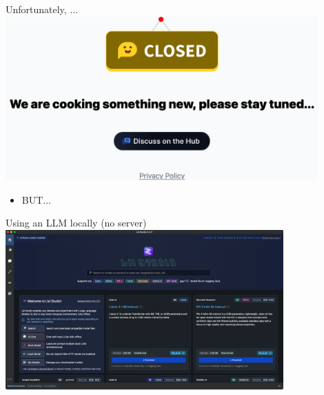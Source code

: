 \documentclass[t,xcolor={dvipsnames},final,aspectratio=169]{beamer}
\begin{document}
{
\begin{frame}{Unfortunately, ...}
\includegraphics[width=0.9\textwidth]{img/huggingchat_closed.png}
\begin{itemize}
\item BUT...
\end{itemize}
\end{frame}
}




{
\begin{frame}{Using an LLM locally (no server)}
\includegraphics[width=0.8\textwidth]{img/lmstudio.png}
\end{frame}
}
\end{document}
